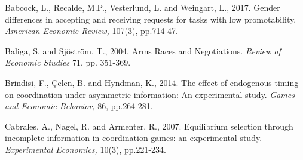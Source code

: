 \documentclass[12pt, letterpaper]{article}
\theoremstyle{plain}
\begin{document}
\newpage
\begin{thebibliography}{10}




\bibitem{} Babcock, L., Recalde, M.P., Vesterlund, L. and Weingart, L., 2017. Gender differences in accepting and receiving requests for tasks with low promotability. \textit{American Economic Review,} 107(3), pp.714-47.


  Baliga, S. and Sj\"ostr\"om, T., 2004. Arms Races and Negotiations. \textit{Review of Economic Studies} 71, pp. 351-369.





 Brindisi, F., \c{C}elen, B. and Hyndman, K., 2014. The effect of endogenous timing on coordination under asymmetric information: An experimental study. \textit{Games and Economic Behavior,} 86, pp.264-281.

\bibitem{} Cabrales, A., Nagel, R. and Armenter, R., 2007. Equilibrium selection through incomplete information in coordination games: an experimental study. \textit{Experimental Economics,} 10(3), pp.221-234.


\end{thebibliography}
\end{document}
